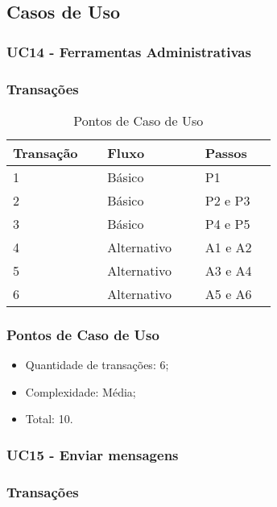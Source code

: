 \subsection{Casos de Uso}

\subsubsection{UC14 - Ferramentas Administrativas}

\subsubsection{Transações}

\begin{table*}[!h]
\centering
\caption{Pontos de Caso de Uso}
\label{Rotulo}
  \begin{tabular}{|p{0.20\linewidth}|p{0.25\linewidth}|p{0.20\linewidth}|}
  \hline
  \textbf{Transação} & \textbf{Fluxo} & \textbf{Passos} \\ 
  \hline
  1 & Básico & P1\\
  \hline
  2 & Básico & P2 e P3\\
  \hline
  3 & Básico & P4 e P5\\
  \hline
  4 & Alternativo & A1 e A2\\
  \hline
  5 & Alternativo & A3 e A4\\
  \hline
  6 & Alternativo & A5 e A6\\
  \hline
  \end{tabular}
\end{table*}

\pagebreak
\subsubsection{Pontos de Caso de Uso}

\begin{itemize}
 \item Quantidade de transações: 6;
 \item Complexidade: Média;
 \item Total: 10.
\end{itemize}

\vfill

\subsubsection{UC15 - Enviar mensagens}

\subsubsection{Transações}

